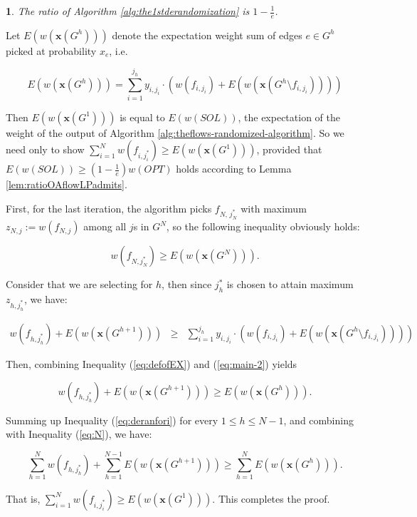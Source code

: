 \documentclass[11pt,english,onecolumn,draftcls]{IEEEtran}
\theoremstyle{plain}
\theoremstyle{plain}
\theoremstyle{plain}
\newtheorem{lem}[thm]{\protect\lemmaname}
\theoremstyle{plain}
\providecommand{\lemmaname}{Lemma}
\begin{document}
\begin{lem}
The ratio of Algorithm \ref{alg:the1stderandomization} is $1-\frac{1}{e}$.\end{lem}
\begin{IEEEproof}
Let $E(w(\mathbf{x}(G^{h})))$ denote the expectation weight sum of
edges $e\in G^{h}$ picked at probability $x_{e}$, i.e.

\begin{equation}
E\left(w\left(\mathbf{x}\left(G^{h}\right)\right)\right)=\sum_{i=1}^{j_{h}}y_{i,j_{i}}\cdot\left(w\left(f_{i,j_{i}}\right)+E\left(w\left(\mathbf{x}\left(G^{h}\setminus f_{i,j_{i}}\right)\right)\right)\right)\label{eq:defofEX}
\end{equation}


Then $E(w(\mathbf{x}(G^{1})))$ is equal to $E(w(SOL))$, the expectation
of the weight of the output of Algorithm \ref{alg:theflows-randomized-algorithm}.
So we need only to show $\sum_{i=1}^{N}w(f_{i,j_{i}^{*}})\geq E(w(\mathbf{x}(G^{1})))$,
provided that $E(w(SOL))\geq(1-\frac{1}{e})w(OPT)$ holds according
to Lemma \ref{lem:ratioOAflowLPadmits}.

First, for the last iteration, the algorithm picks $f_{N,\, j_{N}^{*}}$
with maximum $z_{N,j}:=w(f_{N,j})$ among all $j$s in $G^{N}$, so
the following inequality obviously holds:

\begin{equation}
w(f_{N,j_{N}^{*}})\geq E(w(\mathbf{x}(G^{N}))).\label{eq:N}
\end{equation}


Consider that we are selecting for $h$, then since $j_{h}^{*}$ is
chosen to attain maximum $z_{h,j_{h}^{*}}$, we have:

\begin{equation}
\begin{array}{ccc}
w\left(f_{h,j_{h}^{*}}\right)+E\left(w\left(\mathbf{x}\left(G^{h+1}\right)\right)\right) & \geq & \sum_{i=1}^{j_{h}}y_{i,j_{i}}\cdot\left(w\left(f_{i,j_{i}}\right)+E\left(w\left(\mathbf{x}\left(G^{h}\setminus f_{i,j_{i}}\right)\right)\right)\right)\end{array}\label{eq:main-2}
\end{equation}


Then, combining Inequality (\ref{eq:defofEX}) and (\ref{eq:main-2})
yields

\begin{equation}
w\left(f_{h,j_{h}^{*}}\right)+E\left(w\left(\mathbf{x}\left(G^{h+1}\right)\right)\right)\geq E\left(w\left(\mathbf{x}\left(G^{h}\right)\right)\right).\label{eq:deranfori}
\end{equation}


Summing up Inequality (\ref{eq:deranfori}) for every $1\leq h\leq N-1$,
and combining with Inequality (\ref{eq:N}), we have:

\[
\sum_{h=1}^{N}w\left(f_{h,j_{h}^{*}}\right)+\sum_{h=1}^{N-1}E\left(w\left(\mathbf{x}\left(G^{h+1}\right)\right)\right)\geq\sum_{h=1}^{N}E\left(w\left(\mathbf{x}\left(G^{h}\right)\right)\right).
\]


That is, $\sum_{i=1}^{N}w(f_{i,j_{i}^{*}})\geq E(w(\mathbf{x}(G^{1})))$.
This completes the proof.
\end{IEEEproof}
\end{document}
